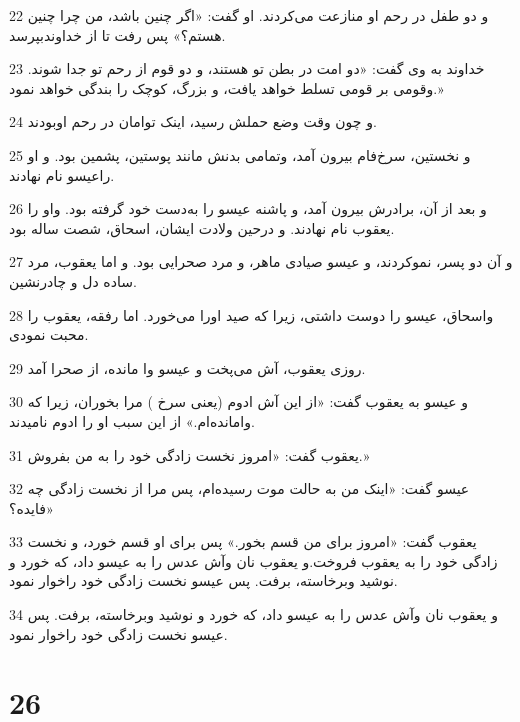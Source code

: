 \par 22 و دو طفل در رحم او منازعت می‌کردند. او گفت: «اگر چنین باشد، من چرا چنین هستم؟» پس رفت تا از خداوندبپرسد.
\par 23 خداوند به وی گفت: «دو امت در بطن تو هستند، و دو قوم از رحم تو جدا شوند. وقومی بر قومی تسلط خواهد یافت، و بزرگ، کوچک را بندگی خواهد نمود.»
\par 24 و چون وقت وضع حملش رسید، اینک توامان در رحم اوبودند.
\par 25 و نخستین، سرخ‌فام بیرون آمد، وتمامی بدنش مانند پوستین، پشمین بود. و او راعیسو نام نهادند.
\par 26 و بعد از آن، برادرش بیرون آمد، و پاشنه عیسو را به‌دست خود گرفته بود. واو را یعقوب نام نهادند. و درحین ولادت ایشان، اسحاق، شصت ساله بود.
\par 27 و آن دو پسر، نموکردند، و عیسو صیادی ماهر، و مرد صحرایی بود. و اما یعقوب، مرد ساده دل و چادرنشین.
\par 28 واسحاق، عیسو را دوست داشتی، زیرا که صید اورا می‌خورد. اما رفقه، یعقوب را محبت نمودی.
\par 29 روزی یعقوب، آش می‌پخت و عیسو وا مانده، از صحرا آمد.
\par 30 و عیسو به یعقوب گفت: «از این آش ادوم (یعنی سرخ ) مرا بخوران، زیرا که وامانده‌ام.» از این سبب او را ادوم نامیدند.
\par 31 یعقوب گفت: «امروز نخست زادگی خود را به من بفروش.»
\par 32 عیسو گفت: «اینک من به حالت موت رسیده‌ام، پس مرا از نخست زادگی چه فایده؟»
\par 33 یعقوب گفت: «امروز برای من قسم بخور.» پس برای او قسم خورد، و نخست زادگی خود را به یعقوب فروخت.و یعقوب نان وآش عدس را به عیسو داد، که خورد و نوشید وبرخاسته، برفت. پس عیسو نخست زادگی خود راخوار نمود.
\par 34 و یعقوب نان وآش عدس را به عیسو داد، که خورد و نوشید وبرخاسته، برفت. پس عیسو نخست زادگی خود راخوار نمود.
 
\chapter{26}

